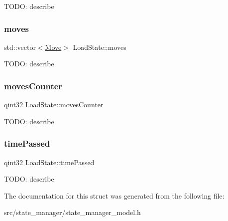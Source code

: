 T\+O\+DO\+: describe \mbox{\label{struct_load_state_a00e978ec8c48f99e7007814da01f328b}} 
\subsubsection{\texorpdfstring{moves}{moves}}
{\footnotesize\ttfamily std\+::vector$<$\mbox{\hyperlink{struct_move}{Move}}$>$ Load\+State\+::moves}

T\+O\+DO\+: describe \mbox{\label{struct_load_state_a72929d48135962cbff700c440a57553f}} 
\subsubsection{\texorpdfstring{movesCounter}{movesCounter}}
{\footnotesize\ttfamily qint32 Load\+State\+::moves\+Counter}

T\+O\+DO\+: describe \mbox{\label{struct_load_state_a1c37e682001c48d107c981f9e225e83c}} 
\subsubsection{\texorpdfstring{timePassed}{timePassed}}
{\footnotesize\ttfamily qint32 Load\+State\+::time\+Passed}

T\+O\+DO\+: describe 

The documentation for this struct was generated from the following file\+:\begin{DoxyCompactItemize}
\item 
src/state\+\_\+manager/state\+\_\+manager\+\_\+model.\+h\end{DoxyCompactItemize}
